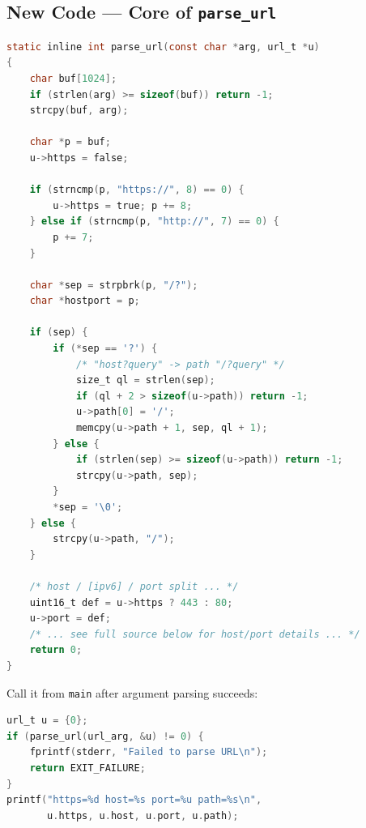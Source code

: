 \subsection{New Code --- Core of \texttt{parse\_url}}

\begin{lstlisting}[style=snippet,language=C]
static inline int parse_url(const char *arg, url_t *u)
{
    char buf[1024];
    if (strlen(arg) >= sizeof(buf)) return -1;
    strcpy(buf, arg);

    char *p = buf;
    u->https = false;

    if (strncmp(p, "https://", 8) == 0) {
        u->https = true; p += 8;
    } else if (strncmp(p, "http://", 7) == 0) {
        p += 7;
    }

    char *sep = strpbrk(p, "/?");
    char *hostport = p;

    if (sep) {
        if (*sep == '?') {
            /* "host?query" -> path "/?query" */
            size_t ql = strlen(sep);
            if (ql + 2 > sizeof(u->path)) return -1;
            u->path[0] = '/';
            memcpy(u->path + 1, sep, ql + 1);
        } else {
            if (strlen(sep) >= sizeof(u->path)) return -1;
            strcpy(u->path, sep);
        }
        *sep = '\0';
    } else {
        strcpy(u->path, "/");
    }

    /* host / [ipv6] / port split ... */
    uint16_t def = u->https ? 443 : 80;
    u->port = def;
    /* ... see full source below for host/port details ... */
    return 0;
}
\end{lstlisting}

Call it from \texttt{main} after argument parsing succeeds:

\begin{lstlisting}[style=snippet,language=C]
url_t u = {0};
if (parse_url(url_arg, &u) != 0) {
    fprintf(stderr, "Failed to parse URL\n");
    return EXIT_FAILURE;
}
printf("https=%d host=%s port=%u path=%s\n",
       u.https, u.host, u.port, u.path);
\end{lstlisting}

